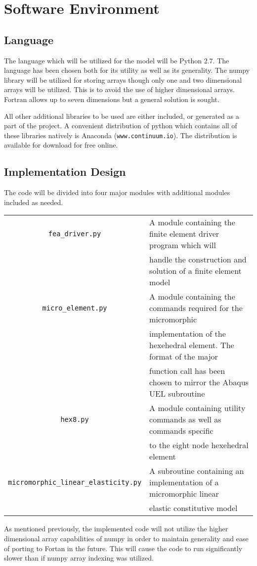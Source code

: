 \section{Software Environment}

\subsection{Language}

The language which will be utilized for the model will be Python 2.7. The language has been chosen both for its utility as well as its generality. The numpy library will be utilized for storing arrays though only one and two dimensional arrays will be utilized. This is to avoid the use of higher dimensional arrays. Fortran allows up to seven dimensions but a general solution is sought.

All other additional libraries to be used are either included, or generated as a part of the project. A convenient distribution of python which contains all of these libraries natively is Anaconda (\verb|www.continuum.io|). The distribution is available for download for free online.

\subsection{Implementation Design}

The code will be divided into four major modules with additional modules included as needed.

\begin{table}[htb!]
\centering
\begin{tabular}{|c|l|}
\hline
\verb|fea_driver.py| & A module containing the finite element driver program which will\\
& handle the construction and solution of a finite element model\\
\hline
\verb|micro_element.py| & A module containing the commands required for the micromorphic\\
& implementation of the hexehedral element. The format of the major\\
& function call has been chosen to mirror the Abaqus UEL subroutine\\
\hline
\verb|hex8.py| & A module containing utility commands as well as commands specific\\
& to the eight node hexehedral element\\
\hline
\verb|micromorphic_linear_elasticity.py| & A subroutine containing an implementation of a micromorphic linear\\
& elastic constitutive model\\
\hline
\end{tabular}
\end{table}

As mentioned previously, the implemented code will not utilize the higher dimensional array capabilities of numpy in order to maintain generality and ease of porting to Fortan in the future. This will cause the code to run significantly slower than if numpy array indexing was utilized.

